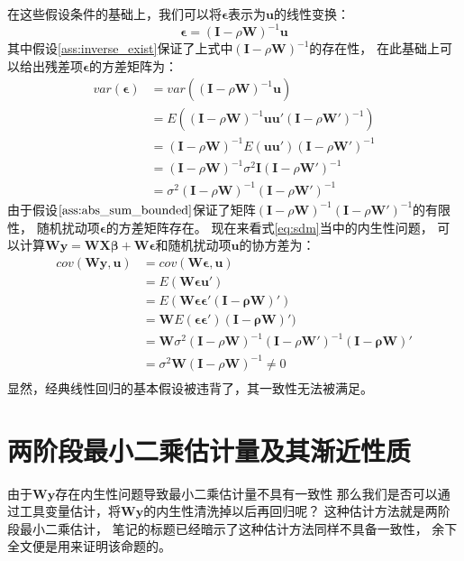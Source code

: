 \documentclass[black,normal,authoryear]{elegantnote}
\newcommand{\bmw}{\bm{W}}
\newcommand{\bmi}{\bm{I}}
\newcommand{\cqref}[1]{式\eqref{#1}}
\begin{document}
    在这些假设条件的基础上，我们可以将$\bm{\epsilon}$表示为$\bm{u}$的线性变换：
    \begin{equation}
        \bm{\epsilon}=(\bmi-\rho\bmw)^{-1}\bm{u}
    \end{equation}
    其中假设\ref{ass:inverse_exist}保证了上式中$(\bmi-\rho\bmw)^{-1}$的存在性，
    在此基础上可以给出残差项$\bm{\epsilon}$的方差矩阵为：
    \begin{equation}
        \begin{split}
            var(\bm{\epsilon})&=var((\bmi-\rho\bmw)^{-1}\bm{u})\\
            &=E((\bmi-\rho\bmw)^{-1}\bm{uu'}(\bmi-\rho\bmw')^{-1})\\
            &=(\bmi-\rho\bmw)^{-1}E(\bm{uu'})(\bmi-\rho\bmw')^{-1}\\
            &=(\bmi-\rho\bmw)^{-1}\sigma^2\bmi(\bmi-\rho\bmw')^{-1}\\
            &=\sigma^2(\bmi-\rho\bmw)^{-1}(\bmi-\rho\bmw')^{-1}
        \end{split}
    \end{equation}
    由于假设$\ref{ass:abs_sum_bounded}$保证了矩阵$(\bmi-\rho\bmw)^{-1}(\bmi-\rho\bmw')^{-1}$的有限性，
    随机扰动项$\bm{\epsilon}$的方差矩阵存在。
    现在来看\cqref{eq:sdm}当中的内生性问题，
    可以计算$\bm{Wy}=\bm{WX\beta}+\bm{W\epsilon}$和随机扰动项$\bm{u}$的协方差为：
    \begin{equation}
        \begin{split}
            cov(\bm{Wy},\bm{u})&=cov(\bm{W\epsilon},\bm{u})\\
            &=E(\bm{W\epsilon}\bm{u}')\\
            &=E(\bm{W\epsilon\epsilon'(\bmi-\rho\bmw)}')\\
            &=\bm{W}E(\bm{\epsilon\epsilon'})\bm{(\bmi-\rho\bmw)}')\\
            &=\bm{W}\sigma^2(\bmi-\rho\bmw)^{-1}(\bmi-\rho\bmw')^{-1}\bm{(\bmi-\rho\bmw)}'\\
            &=\sigma^2\bm{W}(\bmi-\rho\bmw)^{-1}\neq0\\
        \end{split}
    \end{equation}
    显然，经典线性回归的基本假设被违背了，其一致性无法被满足。

    \section{两阶段最小二乘估计量及其渐近性质}
    由于$\bm{Wy}$存在内生性问题导致最小二乘估计量不具有一致性
    那么我们是否可以通过工具变量估计，将$\bm{Wy}$的内生性清洗掉以后再回归呢？
    这种估计方法就是两阶段最小二乘估计，
    笔记的标题已经暗示了这种估计方法同样不具备一致性，
    余下全文便是用来证明该命题的。
    
\end{document}
